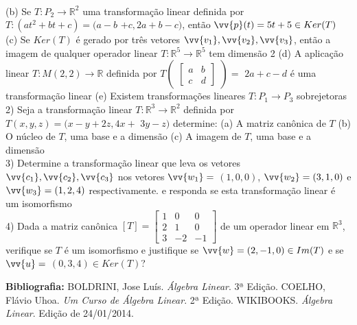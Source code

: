 \documentclass[11pt,a4paper]{article}
\newcommand\tab[1][1.835cm]{\hspace*{#1}}
\newcommand\taba[1][2.55cm]{\hspace*{#1}}
\begin{document}
\begin{flushleft}
\\
\taba (b) Se $T:P_2\rightarrow\mathbb{R}^2$ uma transformação linear definida por $T:(at^2+bt+c) = (a-b$ $+c,  2a +b-c)$, então $\vv{p}(t)=5t+5 \in Ker(T)$ \linebreak
\taba (c) Se $Ker(T)$ é gerado por três vetores $\vv{v_1}, \vv{v_2}, \vv{v_3}$, então a imagem de qualquer operador linear $T:\mathbb{R}^5\rightarrow\mathbb{R}^5$ tem dimensão 2\linebreak
\taba (d) A aplicação linear $T:M(2,2)\rightarrow\mathbb{R}$ definida por $T\begin{pmatrix}\begin{bmatrix} a & b \\c & d\end{bmatrix}\end{pmatrix} = $ $2a+c-d$ é uma transformação linear\linebreak
\taba (e) Existem transformações lineares $T:P_1 \rightarrow P_3$ sobrejetoras\linebreak
\\
\tab 2) Seja a transformação linear $T:\mathbb{R}^3 \rightarrow \mathbb{R}^2$ definida por $T(x,y,z) = (x-y+2z,4x+ $ $3y-z)$ determine: \linebreak
\taba(a) A matriz canônica de $T$ \linebreak
\taba(b) O núcleo de $T$, uma base e a dimensão \linebreak
\taba(c) A imagem de $T$, uma base e a dimensão \linebreak
\\
\tab 3) Determine a transformação linear que leva os vetores $\vv{c_1}, \vv{c_2}, \vv{c_3}$ nos vetores $\vv{w_1}=$ $(1,0,0)$, $\vv{w_2}=(3,1,0)$ e $\vv{w_3}=(1,2,4)$ respectivamente. e responda se esta transformação linear é um isomorfismo\linebreak
\\
\tab 4) Dada a matriz canônica $[T]= \begin{bmatrix}
1 & 0 & 0\\ 2 & 1 & 0\\ 3 & -2 & -1 \end{bmatrix}$ de um operador linear em $\mathbb{R}^3$, verifique se $T$ é um isomorfismo e justifique se $\vv{w}=(2,-1,0) \in Im(T)$ e se $\vv{u}= $ $(0,3,4) \in Ker(T)$?\linebreak



%
%
\textbf{Bibliografia: }BOLDRINI, Jose Luís. \textit{Álgebra Linear}. 3ª Edição. \linebreak
\taba COELHO, Flávio Uhoa. \textit{Um Curso de Álgebra Linear}. 2ª Edição.
\taba WIKIBOOKS. \textit{Álgebra Linear}. Edição de 24/01/2014. \linebreak
\end{flushleft}
\end{document}
